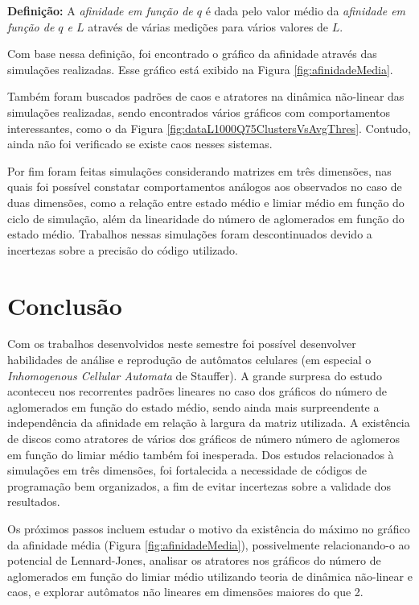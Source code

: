 \documentclass[
	12pt,				%
	openright,			%
	twoside,			%
	a4paper,			%
	english,			%
	french,				%
	spanish,			%
	brazil				%
	]{abntex2}
\begin{document}
\textbf{Definição:} A \textit{afinidade em função de $q$} é dada pelo valor médio da \textit{afinidade em função de $q$ e $L$} através de várias medições para vários valores de $L$.

Com base nessa definição, foi encontrado o gráfico da afinidade através das simulações realizadas. Esse gráfico está exibido na Figura \ref{fig:afinidadeMedia}.

Também foram buscados padrões de caos e atratores na dinâmica não-linear das simulações realizadas, sendo encontrados vários gráficos com comportamentos interessantes, como o da Figura \ref{fig:dataL1000Q75ClustersVsAvgThres}. Contudo, ainda não foi verificado se existe caos nesses sistemas.

Por fim foram feitas simulações considerando matrizes em três dimensões, nas quais foi possível constatar comportamentos análogos aos observados no caso de duas dimensões, como a relação entre estado médio e limiar médio em função do ciclo de simulação, além da linearidade do número de aglomerados em função do estado médio. Trabalhos nessas simulações foram descontinuados devido a incertezas sobre a precisão do código utilizado.



\chapter{Conclusão}

Com os trabalhos desenvolvidos neste semestre foi possível desenvolver habilidades de análise e reprodução de autômatos celulares (em especial o \textit{Inhomogenous Cellular Automata} de Stauffer). A grande surpresa do estudo aconteceu nos recorrentes padrões lineares no caso dos gráficos do número de aglomerados em função do estado médio, sendo ainda mais surpreendente a independência da afinidade em relação à largura da matriz utilizada. A existência de discos como atratores de vários dos gráficos de número número de aglomeros em função do limiar médio também foi inesperada. Dos estudos relacionados à simulações em três dimensões, foi fortalecida a necessidade de códigos de programação bem organizados, a fim de evitar incertezas sobre a validade dos resultados.

Os próximos passos incluem estudar o motivo da existência do máximo no gráfico da afinidade média (Figura \ref{fig:afinidadeMedia}), possivelmente relacionando-o ao potencial de Lennard-Jones, analisar os atratores nos gráficos do número de aglomerados em função do limiar médio utilizando teoria de dinâmica não-linear e caos, e explorar autômatos não lineares em dimensões maiores do que 2.
\end{document}
